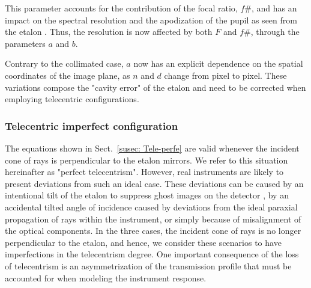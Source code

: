 This parameter accounts for the contribution of the focal ratio, $f\#$, and has an impact on the spectral resolution and the apodization of the pupil as seen from the etalon \citep{beckers}. Thus, the resolution is now affected by both $F$ and $f\#$, through the parameters $a$ and $b$.

Contrary to the collimated case, $a$ now has an explicit dependence on the spatial coordinates of the image plane, as $n$ and $d$ change from pixel to pixel. These variations compose the "cavity error" of the etalon and need to be corrected when employing telecentric configurations.

\subsubsection{Telecentric imperfect configuration}
The equations shown in Sect.~\ref{susec: Tele-perfe} are valid whenever the incident cone of rays is perpendicular to the etalon mirrors. We refer to this situation hereinafter as "perfect telecentrism". However, real instruments are likely to present deviations from such an ideal case. These deviations can be caused by an intentional tilt of the etalon to suppress ghost images on the detector \citep{ghosts-etalon}, by an accidental tilted angle of incidence caused by deviations from the ideal paraxial propagation of rays within the instrument, or simply because of misalignment of the optical components. In the three cases, the incident cone of rays is no longer perpendicular to the etalon, and hence, we consider these scenarios to have imperfections in the telecentrism degree. One important consequence of the loss of telecentrism is an asymmetrization of the transmission profile that must be accounted for when modeling the instrument response.

